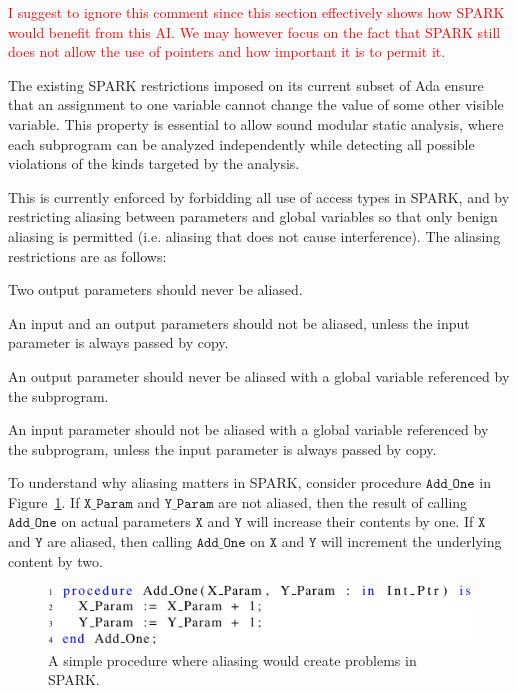 \documentclass{llncs}
\newcommand\maroua[1]{\textcolor{red}{#1}}
\newcommand\var[1]{\ensuremath{\mathtt{#1}}}
\begin{document}

\maroua{I suggest to ignore this comment since this section effectively shows how SPARK would benefit from this AI. We may however focus on the fact that SPARK still does not
allow the use of pointers and how important it is to permit it.}

The existing SPARK restrictions imposed on its current subset of Ada ensure that an assignment to one variable cannot change the value of some other visible variable. This property is essential to allow sound modular static analysis,
where each subprogram can be analyzed independently while detecting all possible violations of the kinds targeted by the analysis.

This is currently enforced by forbidding all use of access types in SPARK, and by restricting aliasing between parameters and global variables so that only
benign aliasing is permitted (i.e. aliasing that does not cause interference).  The aliasing restrictions are as follows:


\begin{compactitem}
  \item Two output parameters should never be aliased.
  \item An input and an output parameters should not be aliased, unless the input parameter is always passed by copy.
  \item An output parameter should never be aliased with a global variable referenced by the subprogram.
  \item An input parameter should not be aliased with a global variable referenced by the subprogram, unless the input parameter is always passed by copy.
\end{compactitem}

To understand why aliasing matters in SPARK, consider procedure \var{Add\_One} in Figure~\ref{fig:spark_ex1}. If \var{X\_Param} and \var{Y\_Param}
are not aliased, then the result of calling \var{Add\_One} on actual parameters \var{X} and \var{Y} will increase their contents by one. If \var{X} and \var{Y} are aliased, then calling
\var{Add\_One} on \var{X} and \var{Y} will increment the underlying content by two.


\begin{figure}[htb!]
\centering
  \captionsetup{justification=centering,margin=0.6cm}
   \includegraphics[]{spark_ex1}
   \caption{A simple procedure where aliasing would create problems in SPARK.}
   \label{fig:spark_ex1}
\end{figure}
\end{document}
